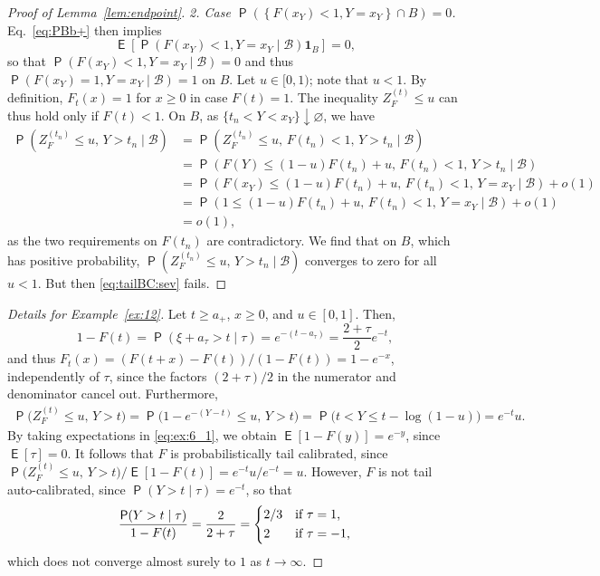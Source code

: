 \documentclass[12pt]{article}
\newcommand{\E}{\operatorname{\mathsf{E}}}
\newcommand{\Q}{\operatorname{\mathsf{P}}}
\newcommand{\Bb}{\mathcal{B}}
\newcommand{\1}{\mathbf{1}} %
\newcommand{\ZFt}{Z_{F}^{(t)}} %
\newcommand{\ZFtn}{Z_F^{(t_n)}}
\theoremstyle{definition}
\begin{document}
\begin{proof}[Proof of Lemma~\ref{lem:endpoint}]
	\emph{2. Case $\Q \left( \left\{ F(x_Y) < 1, Y = x_Y \right\} \cap B \right) = 0$.}
Eq.~\eqref{eq:PBb+} then implies
\[
	\E \left[ \Q \left(F(x_Y) < 1, Y = x_Y \mid \Bb\right) \1_B \right] = 0,
\]
so that $\Q(F(x_Y) < 1, Y = x_Y \mid \Bb) = 0$ and thus $\Q(F(x_Y) = 1, Y = x_Y \mid \Bb) = 1$ on $B$.
Let $u \in [0, 1)$; note that $u < 1$. By definition, $F_t(x) = 1$ for $x \ge 0$ in case $F(t) = 1$. The inequality $\ZFt \le u$ can thus hold only if $F(t) < 1$. 
On $B$, as $\{t_n < Y < x_Y\} \downarrow \varnothing$, we have
\begin{align*}
	\Q \left( \ZFtn \le u, \, Y > t_n \mid \Bb \right)
	&= \Q \left( \ZFtn \le u, \, F(t_n) < 1, \, Y > t_n \mid \Bb \right) \\
	&= \Q \left( F(Y) \le (1-u) F(t_n) + u, \, F(t_n) < 1, \, Y > t_n \mid \Bb \right) \\
	&= \Q \left( F(x_Y) \le (1-u) F(t_n) + u, \, F(t_n) < 1, \, Y = x_Y \mid \Bb \right) + o(1) \\
	&= \Q \left( 1 \le (1-u) F(t_n) + u, \, F(t_n) < 1, \, Y = x_Y \mid \Bb \right) + o(1) \\
	&= o(1),
\end{align*}
as the two requirements on $F(t_n)$ are contradictory. We find that on $B$, which has positive probability, $\Q \left( \ZFtn \le u, \, Y > t_n \mid \Bb \right)$ converges to zero for all $u < 1$. But then \eqref{eq:tailBC:sev} fails. 
\end{proof}


\begin{proof}[Details for Example~\ref{ex:12}]
    Let $t \ge a_+$, $x \ge 0$, and $u \in [0,1]$. Then,
    \begin{equation}\label{eq:ex:6_1}
    	1 - F(t) 
    	= \Q(\xi + a_{\tau} > t \mid \tau)
    	= e^{-(t-a_{\tau})}
    	= \frac{2 + \tau}{2} e^{-t},
    \end{equation}
    and thus $F_t(x) = (F(t+x)-F(t))/(1-F(t)) = 1-e^{-x}$,
    independently of $\tau$, since the factors $(2+\tau)/2$ in the numerator and denominator cancel out. Furthermore,
    \begin{align*}
    	\Q \bigl( \ZFt \le u, \, Y > t \bigr)
    	= \Q \bigl( 1 - e^{-(Y-t)} \le u, \, Y > t \bigr) 
    	= \Q \bigl( t < Y \le t-\log(1-u) \bigr) 
        = e^{-t} u.
    \end{align*}
    By taking expectations in \eqref{eq:ex:6_1}, we obtain $\E[1 - F(y)]  = e^{-y}$, since $\E[\tau] = 0$.
    It follows that $F$ is probabilistically tail calibrated, since
    $\Q\bigl(\ZFt \le u, \, Y > t\bigr)/\E[1-F(t)] = e^{-t}u/e^{-t} = u$.
    However, $F$ is not tail auto-calibrated, since $\Q(Y > t \mid \tau) = e^{-t}$, so that
    \[
    	\frac{\Q(Y > t \mid \tau)}{1 - F(t)}
    	= \frac{2}{2+\tau}
    	= \begin{dcases}
    		2/3 & \text{if $\tau = 1$,} \\
    		2 & \text{if $\tau = -1$,}
    	\end{dcases}
    \]
    which does not converge almost surely to $1$ as $t \to \infty$.
\end{proof}
\end{document}
